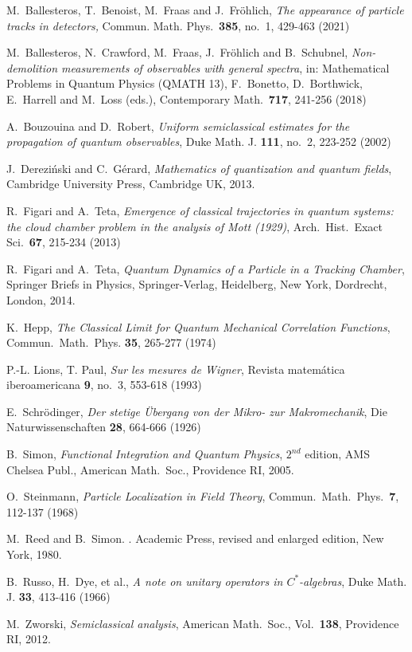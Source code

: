 \documentclass[12pt]{article}
\begin{document}
\begin{thebibliography}{References}

 M.~Ballesteros, T.~Benoist, M.~Fraas and J.~Fr\"{o}hlich, \textit{The appearance of particle tracks in detectors,} Commun. Math. Phys.~\textbf{385}, no.~1, 429-463 (2021)

 M.~Ballesteros, N.~Crawford, M.~Fraas, J.~Fr\"ohlich and B.~Schubnel, \textit{Non-demolition
measurements of observables with general spectra}, in: Mathematical Problems in Quantum Physics (QMATH 13), 
F.~Bonetto, D.~Borthwick, E.~Harrell and M.~Loss (eds.), Contemporary Math.~{\bf{717}}, 241-256 (2018)

 A.~Bouzouina and D.~Robert, \textit{Uniform semiclassical estimates for the propagation of quantum observables}, Duke Math. J. {\bf{111}}, no.~2, 223-252 (2002)

 J.~Dereziński and C.~Gérard, \textit{Mathematics of quantization and quantum fields}, Cambridge University Press, Cambridge UK, 2013.

 R.~Figari and A.~Teta, \textit{Emergence of classical trajectories in quantum systems: the cloud chamber problem in the analysis of Mott (1929)}, Arch.~Hist.~Exact Sci.~{\bf{67}}, 215-234 (2013)

 R.~Figari and A.~Teta, \textit{Quantum Dynamics of a Particle in a Tracking Chamber}, Springer Briefs in Physics, Springer-Verlag, Heidelberg, New York, Dordrecht, London, 2014.

 K.~Hepp, \textit{The Classical Limit for Quantum Mechanical Correlation Functions}, Commun.~Math.~Phys. {\bf{35}}, 265-277 (1974)

 P.-L. Lions, T. Paul, \textit{Sur les mesures de Wigner}, Revista matem\'atica iberoamericana {\bf{9}}, no.~3, 553-618 (1993)

 E.~Schr\"odinger, \textit{Der stetige \"Ubergang von der Mikro- zur Makromechanik}, Die Naturwissenschaften {\bf{28}}, 664-666 (1926)

 B.~Simon, \textit{Functional Integration and Quantum Physics}, $2^{nd}$ edition, AMS Chelsea Publ., American Math.~Soc., Providence RI, 2005.

 O.~Steinmann, \textit{Particle Localization in Field Theory}, Commun.~Math.~Phys.~{\bf{7}}, 112-137 (1968)

M.~Reed and B.~Simon.
.
\newblock Academic Press, revised and enlarged edition, New York, 1980.

 B.~Russo, H.~Dye, et al., \textit{A note on unitary operators in $C^{*}$-algebras}, Duke Math. J. {\bf{33}}, 413-416 (1966)

 M.~Zworski, \textit{Semiclassical analysis}, American Math.~Soc., Vol.~{\bf{138}}, Providence RI, 2012.


\end{thebibliography}
\end{document}
